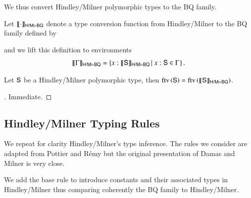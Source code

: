 \documentclass{report}
\begin{document}
  We thus convert Hindley/Milner polymorphic types to the BQ family.
  \begin{dfn}
    Let $\llbracket{\cdot}\rrbracket_{\textsf{H/M}\rhd\textsf{BQ}}$ denote a type conversion function from Hindley/Milner to the BQ family
    defined by
    and we lift this definition to environments
    \begin{displaymath}
      \llbracket{\Gamma}\rrbracket_{\textsf{H/M}\rhd\textsf{BQ}} = \left\{{x:\llbracket{\textsf{S}}\rrbracket_{\textsf{H/M}\rhd\textsf{BQ}}}\left|\ {x:\textsf{S}\in\Gamma}\right.\right\}\textrm{.}
    \end{displaymath}
  \end{dfn}
  \begin{lemma}
    Let $\textsf{S}$ be a Hindley/Milner polymorphic type, then
    $\mathop{\rm ftv}\nolimits\left({\textsf{S}}\right)=\mathop{\rm ftv}\nolimits\left({\llbracket{\textsf{S}}\rrbracket_{\textsf{H/M}\rhd\textsf{BQ}}}\right)$.
  \end{lemma}
  \begin{proof}[]
    Immediate.
  \end{proof}
  
  \subsection{Hindley/Milner Typing Rules}
  We repeat for clarity Hindley/Milner's type inference. The rules we consider are adapted
  from Pottier and R\'emy \cite{pottier-remy-emlti} but the original presentation of
  Damas and Milner \cite{damasmilner:principal-type-schemes} is very close.
  We add the base rule \mlbase to introduce constants and their associated
  types in Hindley/Milner thus comparing coherently the BQ family to Hindley/Milner.
  
\end{document}
